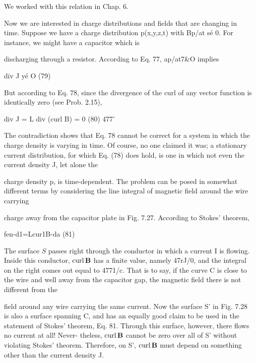 We worked with this relation in Chap. 6.

Now we are interested in charge distributions and fields that are
changing in time. Suppose we have a charge distribution p(x,y,z,t)
with Bp/at sé 0. For instance, we might have a capacitor which is

discharging through a resistor. According to Eq. 77, ap/at7&O
implies

\begin{equation}
\end{equation}
div J yé O (79)

But according to Eq. 78, since the divergence of the curl of any
vector function is identically zero (see Prob. 2.15),

\begin{equation}
\end{equation}
div J = L div (curl B) = 0 (80)
477'

The contradiction shows that Eq. 78 cannot be correct for a system
in which the charge density is varying in time. Of course, no one
claimed it was; a stationary current distribution, for which Eq. (78)
does hold, is one in which not even the current density J, let alone the

charge density p, is time-dependent.
The problem can be posed in somewhat different terms by considering
the line integral of magnetic field around the wire carrying

charge away from the capacitor plate in Fig. 7.27. According to
Stokes' theorem,

\begin{equation}
\end{equation}
fen-d1=Lcur1B-da (81)

The surface $S$ passes right through the conductor in which a current
I is flowing. Inside this conductor, $\operatorname{curl}\mathbf{B}$ has a finite value,
namely 47rJ/0, and the integral on the right comes out equal to 4771/c.
That is to say, if the curve C is close to the wire and well away from
the capacitor gap, the magnetic field there is not different from the

field around any wire carrying the same current. Now the surface S'
in Fig. 7.28 is also a surface spanning C, and has an equally good
claim to be used in the statement of Stokes' theorem, Eq. 81.
Through this surface, however, there flows no current at all! Never-
theless, $\operatorname{curl}\mathbf{B}$ cannot be zero over all of S' without violating Stokes'
theorem. Therefore, on S', $\operatorname{curl}\mathbf{B}$ must depend on something other
than the current density J.

